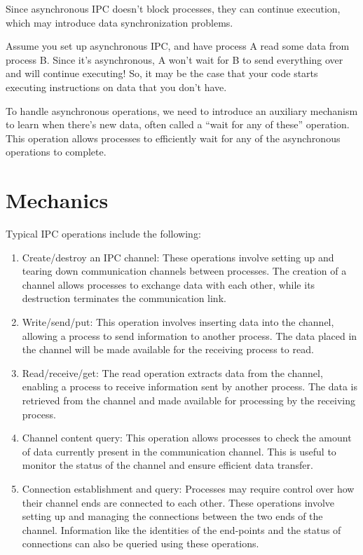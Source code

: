 \documentclass{report}
\newcommand{\exampleBegin}[1]{\begin{tcolorbox}[colback=blue!5!white,colframe=black!75!blue,title={Example:
      #1}]}
\newcommand{\exampleEnd}{\end{tcolorbox}}
\begin{document}
Since asynchronous IPC doesn't block processes, they can continue execution, which may introduce
data synchronization problems.

\exampleBegin{404}
Assume you set up asynchronous IPC, and have process A read some data from process B. Since it's
asynchronous, A won't wait for B to send everything over and will continue executing! So, it may be
the case that your code starts executing instructions on data that you don't have.
\exampleEnd

To handle asynchronous operations, we need to introduce an auxiliary mechanism to learn when there's
new data, often called a ``wait for any of these'' operation. This operation allows processes to
efficiently wait for any of the asynchronous operations to complete.



\section{Mechanics}
Typical IPC operations include the following:

\begin{enumerate}[label=\textit{(\roman*)}]
\item Create/destroy an IPC channel: These operations involve setting up and tearing down
  communication channels between processes. The creation of a channel allows processes to exchange
  data with each other, while its destruction terminates the communication link.
\item Write/send/put: This operation involves inserting data into the channel, allowing a process to
  send information to another process. The data placed in the channel will be made available for the
  receiving process to read.
\item Read/receive/get: The read operation extracts data from the channel, enabling a process to
  receive information sent by another process. The data is retrieved from the channel and made
  available for processing by the receiving process.
\item Channel content query: This operation allows processes to check the amount of data currently
  present in the communication channel. This is useful to monitor the status of the channel and ensure
  efficient data transfer.
\item Connection establishment and query: Processes may require control over how their channel ends
  are connected to each other. These operations involve setting up and managing the connections
  between the two ends of the channel. Information like the identities of the end-points and the
  status of connections can also be queried using these operations.
\end{enumerate}
\end{document}

